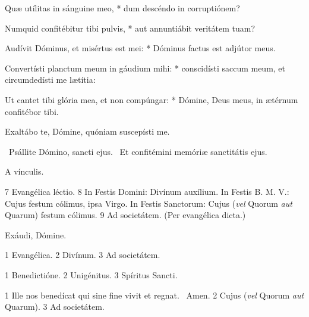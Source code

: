 Quæ utílitas in sánguine meo, * dum descéndo in corruptiónem?

Numquid confitébitur tibi pulvis, * aut annuntiábit veritátem tuam?

Audívit Dóminus, et misértus est mei: * Dóminus factus est adjútor meus.

Convertísti planctum meum in gáudium mihi: * conscidísti saccum meum, et circumdedísti me lætítia:

Ut cantet tibi glória mea, et non compúngar: * Dómine, Deus meus, in ætérnum confitébor tibi.

 Exaltábo te, Dómine, quóniam suscepísti me.


\V\ Psállite Dómino, sancti ejus. \R\ Et confitémini memóriæ sanctitátis ejus.


 A vínculis.

 7 Evangélica léctio. 8 In Festis Domini: Divínum auxílium. In Festis B. M. V.: Cujus festum cólimus, ipsa Virgo. In Festis Sanctorum: Cujus (\textit{vel} Quorum \textit{aut} Quarum) festum cólimus. 9 Ad societátem. (Per evangélica dicta.)


 Exáudi, Dómine.


 1 Evangélica. 2 Divínum. 3 Ad societátem.


 1 Benedictióne. 2 Unigénitus. 3 Spíritus Sancti.


 1 Ille nos benedícat qui sine fine vivit et regnat. \R\ Amen. 2 Cujus (\textit{vel} Quorum \textit{aut} Quarum). 3 Ad societátem.

